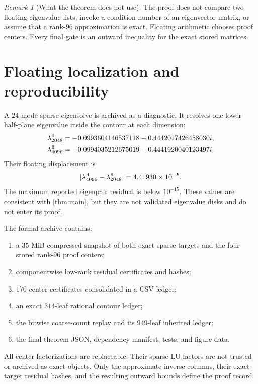 \documentclass[11pt]{article}
\theoremstyle{definition}
\theoremstyle{remark}
\newtheorem{remark}[theorem]{Remark}
\begin{document}
\begin{remark}[What the theorem does not use]
The proof does not compare two floating eigenvalue lists, invoke a condition
number of an eigenvector matrix, or assume that a rank-\(96\) approximation is
exact.  Floating arithmetic chooses proof centers.  Every final gate is an
outward inequality for the exact stored matrices.
\end{remark}

\section{Floating localization and reproducibility}
\label{sec:numerics}

A \(24\)-mode sparse eigensolve is archived as a diagnostic.  It resolves one
lower-half-plane eigenvalue inside the contour at each dimension:
\begin{align}
 \lambda_{2048}^{\rm fl}
 &=-0.0993604146537118-0.4442017426458030i,\nonumber\\
 \lambda_{4096}^{\rm fl}
 &=-0.0994035212675019-0.4441920040123497i.
 \label{eq:floating-locations}
\end{align}
Their floating displacement is
\[
 |\lambda_{4096}^{\rm fl}-\lambda_{2048}^{\rm fl}|
 =4.41930\times10^{-5}.
\]
The maximum reported eigenpair residual is below \(10^{-15}\).  These values
are consistent with \cref{thm:main}, but they are not validated eigenvalue
disks and do not enter its proof.

The formal archive contains:
\begin{enumerate}[leftmargin=2em]
 \item a \(35\) MiB compressed snapshot of both exact sparse targets and the
       four stored rank-\(96\) proof centers;
 \item componentwise low-rank residual certificates and hashes;
 \item \(170\) center certificates consolidated in a CSV ledger;
 \item an exact \(314\)-leaf rational contour ledger;
 \item the bitwise coarse-count replay and its \(949\)-leaf inherited ledger;
 \item the final theorem JSON, dependency manifest, tests, and figure data.
\end{enumerate}

All center factorizations are replaceable.  Their sparse LU factors are not
trusted or archived as exact objects.  Only the approximate inverse columns,
their exact-target residual hashes, and the resulting outward bounds define
the proof record.
\end{document}

